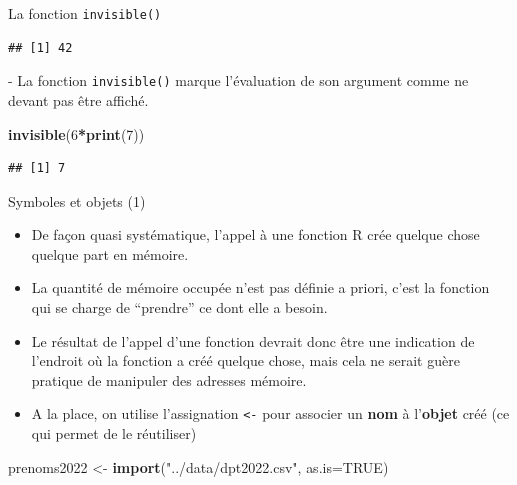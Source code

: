 \documentclass[
  ignorenonframetext,
]{beamer}
\newenvironment{Shaded}{\begin{snugshade}}{\end{snugshade}}
\newcommand{\AttributeTok}[1]{\textcolor[rgb]{0.13,0.29,0.53}{#1}}
\newcommand{\ConstantTok}[1]{\textcolor[rgb]{0.56,0.35,0.01}{#1}}
\newcommand{\DecValTok}[1]{\textcolor[rgb]{0.00,0.00,0.81}{#1}}
\newcommand{\FunctionTok}[1]{\textcolor[rgb]{0.13,0.29,0.53}{\textbf{#1}}}
\newcommand{\NormalTok}[1]{#1}
\newcommand{\OtherTok}[1]{\textcolor[rgb]{0.56,0.35,0.01}{#1}}
\newcommand{\SpecialCharTok}[1]{\textcolor[rgb]{0.81,0.36,0.00}{\textbf{#1}}}
\newcommand{\StringTok}[1]{\textcolor[rgb]{0.31,0.60,0.02}{#1}}
\providecommand{\tightlist}{%
  \setlength{\itemsep}{0pt}\setlength{\parskip}{0pt}}
\begin{document}
\begin{frame}[fragile]{La fonction \texttt{invisible()}}
\begin{verbatim}
## [1] 42
\end{verbatim}

\normalsize - La fonction \texttt{invisible()} marque l'évaluation de
son argument comme ne devant pas être affiché.

\tiny

\begin{Shaded}
\begin{Highlighting}[]
\FunctionTok{invisible}\NormalTok{(}\DecValTok{6}\SpecialCharTok{*}\FunctionTok{print}\NormalTok{(}\DecValTok{7}\NormalTok{))}
\end{Highlighting}
\end{Shaded}

\begin{verbatim}
## [1] 7
\end{verbatim}

\normalsize
\end{frame}

\begin{frame}[fragile]{Symboles et objets (1)}
\protect\hypertarget{symboles-et-objets-1}{}
\begin{itemize}
\tightlist
\item
  De façon quasi systématique, l'appel à une fonction R crée quelque
  chose quelque part en mémoire.
\item
  La quantité de mémoire occupée n'est pas définie a priori, c'est la
  fonction qui se charge de ``prendre'' ce dont elle a besoin.
\item
  Le résultat de l'appel d'une fonction devrait donc être une indication
  de l'endroit où la fonction a créé quelque chose, mais cela ne serait
  guère pratique de manipuler des adresses mémoire.
\item
  A la place, on utilise l'assignation \texttt{\textless{}-} pour
  associer un \textbf{nom} à l'\textbf{objet} créé (ce qui permet de le
  réutiliser)
\end{itemize}

\tiny

\begin{Shaded}
\begin{Highlighting}[]
\NormalTok{prenoms2022 }\OtherTok{\textless{}{-}} \FunctionTok{import}\NormalTok{(}\StringTok{"../data/dpt2022.csv"}\NormalTok{, }\AttributeTok{as.is=}\ConstantTok{TRUE}\NormalTok{)}
\end{Highlighting}
\end{Shaded}

\normalsize
\end{frame}
\end{document}
